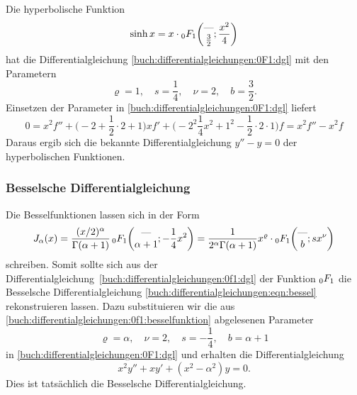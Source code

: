 \begin{beispiel}
Die hyperbolische Funktion
\[
\sinh x
=
x\cdot \mathstrut_0F_1\biggl(
\begin{matrix}\text{---}\\\frac32\end{matrix};\frac{x^2}{4}
\biggr)
\]
hat die Differentialgleichung
\eqref{buch:differentialgleichungen:0F1:dgl}
mit den Parametern
\[
\varrho=1,\quad
s=\frac14,\quad
\nu=2,\quad
b=\frac32.
\]
Einsetzen der Parameter in
\eqref{buch:differentialgleichungen:0F1:dgl}
liefert
\[
0
=
x^2f''
+
\biggl(-2+\frac12\cdot 2 + 1\biggr) xf'
+
\biggl(-2^2\frac14x^2 + 1^2 - \frac12 \cdot 2 \cdot 1\biggr) f
=
x^2f''
-x^2f
\]
Daraus ergib sich die bekannte Differentialgleichung
$y''-y=0$
der hyperbolischen Funktionen.
\end{beispiel}

%
%
\subsubsection{Besselsche Differentialgleichung}
Die Besselfunktionen lassen sich in der Form
\begin{equation}
J_\alpha(x)
=
\frac{(x/2)^\alpha}{\Gamma(\alpha+1)} \,
\mathstrut_0F_1\biggl(
\begin{matrix}\text{---}\\\alpha+1\end{matrix};-\frac14x^2
\biggr)
=
\frac{1}{2^\alpha\Gamma(\alpha+1)}
x^\varrho\cdot
\mathstrut_0F_1\biggl(
\begin{matrix}\text{---}\\b\end{matrix};sx^\nu
\biggr)
\label{buch:differentialgleichungen:0f1:besselfunktion}
\end{equation}
schreiben.
Somit sollte sich aus der
Differentialgleichung~\eqref{buch:differentialgleichungen:0f1:dgl}
der Funktion $\mathstrut_0F_1$ die Besselsche Differentialgleichung
\eqref{buch:differentialgleichungen:eqn:bessel} rekonstruieren lassen.
Dazu substituieren wir die aus
\eqref{buch:differentialgleichungen:0f1:besselfunktion}
abgelesenen Parameter
\[
\varrho=\alpha,\quad\nu=2,\quad s=-\frac14,\quad b=\alpha+1
\]
in \eqref{buch:differentialgleichungen:0F1:dgl} und erhalten
die Differentialgleichung
\begin{equation}
x^2y''
+
xy'
+
(x^2 - \alpha^2)y
=
0.
\label{buch:differentialgleichungen:0F1:besseldgl}
\end{equation}
Dies ist tatsächlich die Besselsche Differentialgleichung.


